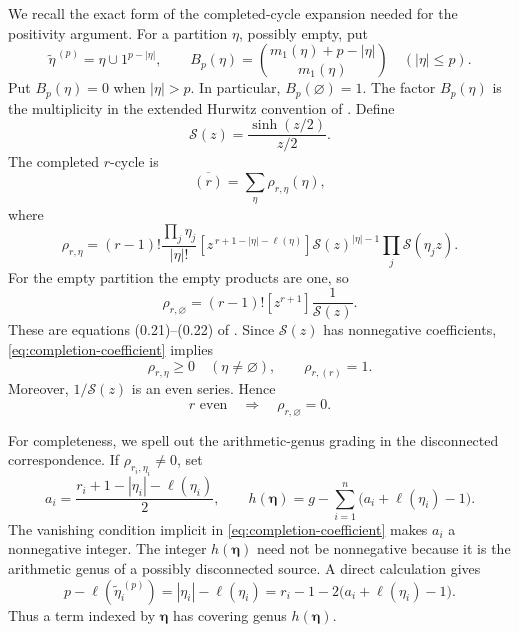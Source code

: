 \documentclass[11pt]{amsart}
\theoremstyle{plain}
\theoremstyle{definition}
\numberwithin{equation}{section}
\begin{document}
We recall the exact form of the completed-cycle expansion needed for the
positivity argument.  For a partition $\eta$, possibly empty, put
\[
 \widetilde\eta^{\,(p)}=\eta\cup1^{p-|\eta|},\qquad
 B_p(\eta)=
 \binom{m_1(\eta)+p-|\eta|}{m_1(\eta)}
 \quad (|\eta|\leq p).
\]
Put $B_p(\eta)=0$ when $|\eta|>p$.  In particular,
$B_p(\varnothing)=1$.
The factor $B_p(\eta)$ is the multiplicity in the extended Hurwitz
convention of \cite[equation~(0.5)]{OkounkovPandharipande}.  Define
\[
 \mathcal S(z)=\frac{\sinh(z/2)}{z/2}.
\]
The completed $r$-cycle is
\begin{equation}\label{eq:completed-cycle-expansion}
 \overline{(r)}=\sum_\eta\rho_{r,\eta}(\eta),
\end{equation}
where
\begin{equation}\label{eq:completion-coefficient}
 \rho_{r,\eta}
 =(r-1)!\frac{\prod_j\eta_j}{|\eta|!}
 [z^{\,r+1-|\eta|-\ell(\eta)}]
 \mathcal S(z)^{|\eta|-1}\prod_j\mathcal S(\eta_jz).
\end{equation}
For the empty partition the empty products are one, so
\begin{equation}\label{eq:empty-completion-coefficient}
 \rho_{r,\varnothing}
 =(r-1)![z^{r+1}]\frac1{\mathcal S(z)}.
\end{equation}
These are equations (0.21)--(0.22) of
\cite{OkounkovPandharipande}.  Since $\mathcal S(z)$ has nonnegative
coefficients, \eqref{eq:completion-coefficient} implies
\begin{equation}\label{eq:completion-positivity}
 \rho_{r,\eta}\geq0\quad(\eta\neq\varnothing),
 \qquad \rho_{r,(r)}=1.
\end{equation}
Moreover, $1/\mathcal S(z)$ is an even series.  Hence
\begin{equation}\label{eq:even-empty-vanishing}
 r\text{ even}\quad\Longrightarrow\quad
 \rho_{r,\varnothing}=0.
\end{equation}

For completeness, we spell out the arithmetic-genus grading in the
disconnected correspondence.  If $\rho_{r_i,\eta_i}\neq0$, set
\begin{equation}\label{eq:completion-genus-loss}
 a_i=\frac{r_i+1-|\eta_i|-\ell(\eta_i)}2,
 \qquad
 h(\boldsymbol\eta)
 =g-\sum_{i=1}^n\bigl(a_i+\ell(\eta_i)-1\bigr).
\end{equation}
The vanishing condition implicit in
\eqref{eq:completion-coefficient} makes $a_i$ a nonnegative integer.  The
integer $h(\boldsymbol\eta)$ need not be nonnegative because it is the
arithmetic genus of a possibly disconnected source.  A direct calculation
gives
\begin{equation}\label{eq:completion-defect-identity}
 p-\ell(\widetilde\eta_i^{\,(p)})
 =|\eta_i|-\ell(\eta_i)
 =r_i-1-2\bigl(a_i+\ell(\eta_i)-1\bigr).
\end{equation}
Thus a term indexed by $\boldsymbol\eta$ has covering genus
$h(\boldsymbol\eta)$.
\end{document}
